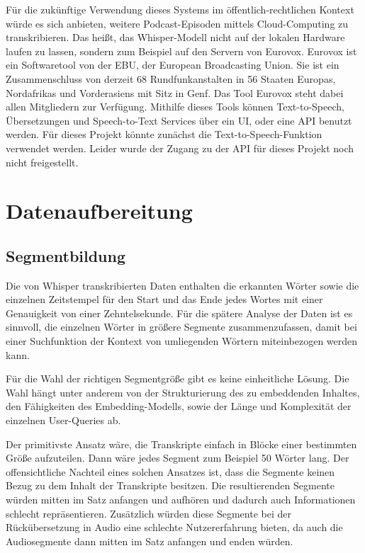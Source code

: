 Für die zukünftige Verwendung dieses Systems im öffentlich-rechtlichen Kontext würde es sich anbieten, weitere Podcast-Episoden mittels Cloud-Computing zu transkribieren.
Das heißt, das Whisper-Modell nicht auf der lokalen Hardware laufen zu lassen, sondern zum Beispiel auf den Servern von Eurovox.
Eurovox ist ein Softwaretool von der EBU, der European Broadcasting Union.
Sie ist ein Zusammenschluss von derzeit 68 Rundfunkanstalten in 56 Staaten Europas, Nordafrikas und Vorderasiens mit Sitz in Genf.
Das Tool Eurovox steht dabei allen Mitgliedern zur Verfügung.
Mithilfe dieses Tools können Text-to-Speech, Übersetzungen und Speech-to-Text Services über ein UI, oder eine API benutzt werden.
Für dieses Projekt könnte zunächst die Text-to-Speech-Funktion verwendet werden.
Leider wurde der Zugang zu der API für dieses Projekt noch nicht freigestellt.~\cite{eurovox2024}

\section{Datenaufbereitung}

\subsection{Segmentbildung}

Die von Whisper transkribierten Daten enthalten die erkannten Wörter sowie die einzelnen Zeitstempel für den Start und das Ende jedes Wortes mit einer Genauigkeit von einer Zehntelsekunde.
Für die spätere Analyse der Daten ist es sinnvoll, die einzelnen Wörter in größere Segmente zusammenzufassen, damit bei einer Suchfunktion der Kontext von umliegenden Wörtern miteinbezogen werden kann.

Für die Wahl der richtigen Segmentgröße gibt es keine einheitliche Lösung.
Die Wahl hängt unter anderem von der Strukturierung des zu embeddenden Inhaltes, den Fähigkeiten des Embedding-Modells, sowie der Länge und Komplexität der einzelnen User-Queries ab.

Der primitivste Ansatz wäre, die Transkripte einfach in Blöcke einer bestimmten Größe aufzuteilen.
Dann wäre jedes Segment zum Beispiel 50 Wörter lang.
Der offensichtliche Nachteil eines solchen Ansatzes ist, dass die Segmente keinen Bezug zu dem Inhalt der Transkripte besitzen.
Die resultierenden Segmente würden mitten im Satz anfangen und aufhören und dadurch auch Informationen schlecht repräsentieren.
Zusätzlich würden diese Segmente bei der Rückübersetzung in Audio eine schlechte Nutzererfahrung bieten, da auch die Audiosegmente dann mitten im Satz anfangen und enden würden.

